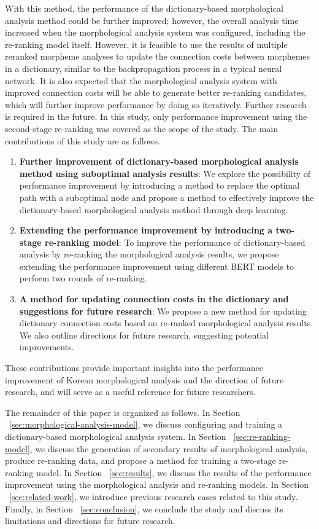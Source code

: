 \documentclass[AMS,STIX2COL]{WileyNJD-v2}
\begin{document}
    With this method, the performance of the dictionary-based morphological analysis method could be further improved; however, the overall analysis time increased when the morphological analysis system was configured, including the re-ranking model itself.
    However, it is feasible to use the results of multiple reranked morpheme analyses to update the connection costs between morphemes in a dictionary, similar to the backpropagation process in a typical neural network.
    It is also expected that the morphological analysis system with improved connection costs will be able to generate better re-ranking candidates, which will further improve performance by doing so iteratively.
    Further research is required in the future.
    In this study, only performance improvement using the second-stage re-ranking was covered as the scope of the study.
    The main contributions of this study are as follows.
    \begin{enumerate}
        \item \textbf{Further improvement of dictionary-based morphological analysis method using suboptimal analysis results}: We explore the possibility of performance improvement by introducing a method to replace the optimal path with a suboptimal node and propose a method to effectively improve the dictionary-based morphological analysis method through deep learning.
        \item \textbf{Extending the performance improvement by introducing a two-stage re-ranking model}: To improve the performance of dictionary-based analysis by re-ranking the morphological analysis results, we propose extending the performance improvement using different BERT models to perform two rounds of re-ranking.
        \item \textbf{A method for updating connection costs in the dictionary and suggestions for future research}: We propose a new method for updating dictionary connection costs based on re-ranked morphological analysis results. We also outline directions for future research, suggesting potential improvements.
    \end{enumerate}
    These contributions provide important insights into the performance improvement of Korean morphological analysis and the direction of future research, and will serve as a useful reference for future researchers.

    The remainder of this paper is organized as follows.
    In Section ~\ref{sec:morphological-analysis-model}, we discuss configuring and training a dictionary-based morphological analysis system.
    In Section ~\ref{sec:re-ranking-model}, we discuss the generation of secondary results of morphological analysis, produce re-ranking data, and propose a method for training a two-stage re-ranking model.
    In Section ~\ref{sec:results}, we discuss the results of the performance improvement using the morphological analysis and re-ranking models.
    In Section ~\ref{sec:related-work}, we introduce previous research cases related to this study.
    Finally, in Section ~\ref{sec:conclusion}, we conclude the study and discuss its limitations and directions for future research.
\end{document}
